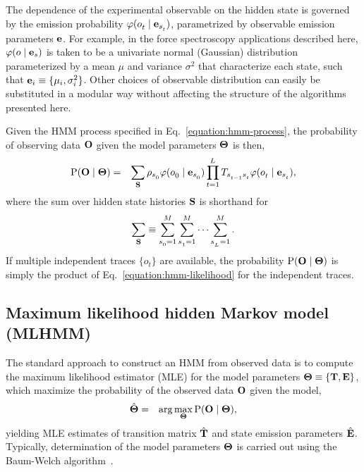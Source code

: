 \documentclass[aps,pre,twocolumn,superscriptaddress,nofootinbib,longbibliography]{revtex4-1}
\newcommand{\bfm}[1]{{\bf #1}}
\renewcommand{\Pr}{\mathrm{P}}
\begin{document}
{{\color{magenta}The dependence of the experimental observable on the hidden state}
is governed by the emission probability $\varphi(o^{}_{t} \mid \bfm{e}_{s^{}_{t}})$, parametrized by observable emission parameters $\bfm{e}$.
For example, in the force spectroscopy applications described here, $\varphi(o \mid \bfm{e}_s)$ is taken to be a univariate normal (Gaussian) distribution parameterized by a mean $\mu$ and variance $\sigma^2$ that characterize each state, such that $\bfm{e}_i \equiv \{\mu_i, \sigma^2_i\}$.
Other choices of observable distribution can easily be substituted in a modular way without affecting the structure of the algorithms presented here.

Given the HMM process specified in Eq.~\ref{equation:hmm-process}, the probability of observing data $\bfm{O}$ given the model parameters $\bfm{\Theta}$ is then,
\begin{eqnarray}
\Pr(\bfm{O} \mid \bfm{\Theta}) &=& \sum_{\bfm{S}}  \rho_{s^{}_{0}} \varphi(o^{}_{0} \mid \bfm{e}_{s^{}_{0}}) \prod_{t=1}^{L^{}} T_{s^{}_{t-1} s^{}_{t}} \varphi(o^{}_{t} \mid \bfm{e}_{s^{}_{t}}) \label{equation:hmm-likelihood} ,
\end{eqnarray}
where the sum over hidden state histories $\bfm{S}$ is shorthand for
\begin{eqnarray}
\sum_{\bfm{S}} \equiv \sum_{s^{}_{0}=1}^M \sum_{s^{}_{1}=1}^M \cdots \sum_{s^{}_{L^{}}=1}^M .
\end{eqnarray}
If multiple independent traces $\{o_t\}$ are available, the probability $\Pr(\bfm{O} \mid \bfm{\Theta})$ is simply the product of Eq.~\ref{equation:hmm-likelihood} for the independent traces.

\subsection{Maximum likelihood hidden Markov model (MLHMM)}

The standard approach to construct an HMM from observed data is to compute the maximum likelihood estimator (MLE) for the model parameters $\bfm{\Theta} \equiv \{\bfm{T}, \bfm{E}\}$, which maximize the probability of the observed data $\bfm{O}$ given the model,
\begin{eqnarray}
\hat{\bfm{\Theta}} &=& \arg\max_\bfm{\Theta} \Pr(\bfm{O} \mid \bfm{\Theta}) ,
\end{eqnarray}
yielding MLE estimates of transition matrix $\hat{\bfm{T}}$ and state emission parameters $\hat{\bfm{E}}$.
Typically, determination of the model parameters $\bfm{\Theta}$ is carried out using the Baum-Welch algorithm~\cite{baum:1970:ann-math-statist:baum-welch}.

}
\end{document}
